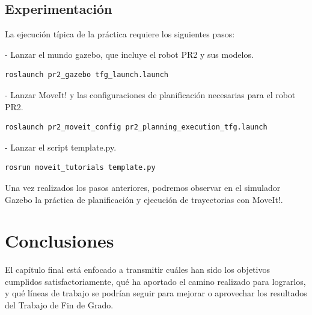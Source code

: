 \documentclass[12pt,spanish,chapterprefix, numbers=noenddot]{book}
\numberwithin{equation}{section}
\numberwithin{figure}{section}
\begin{document}
\section{Experimentación}
La ejecución típica \cite{tfg_video_1} \cite{tfg_video_2} de la práctica requiere los siguientes pasos: 

- Lanzar el mundo gazebo, que incluye el robot PR2 y sus modelos.
\vspace{20pt}
	\begin{lstlisting}[frame=single]
roslaunch pr2_gazebo tfg_launch.launch
    \end{lstlisting}
- Lanzar MoveIt! y las configuraciones de planificación necesarias para el robot PR2.
\vspace{20pt}
	\begin{lstlisting}[frame=single]
roslaunch pr2_moveit_config pr2_planning_execution_tfg.launch
    \end{lstlisting}
- Lanzar el script template.py.
	\begin{lstlisting}[frame=single]
rosrun moveit_tutorials template.py
    \end{lstlisting}

Una vez realizados los pasos anteriores, podremos observar en el simulador Gazebo la práctica de planificación y ejecución de trayectorias con MoveIt!. 

\chapter{Conclusiones}
El capítulo final está enfocado a transmitir cuáles han sido los objetivos cumplidos satisfactoriamente, qué ha aportado el camino realizado para lograrlos, y qué líneas de trabajo se podrían seguir para mejorar o aprovechar los resultados del Trabajo de Fin de Grado.  
\end{document}
